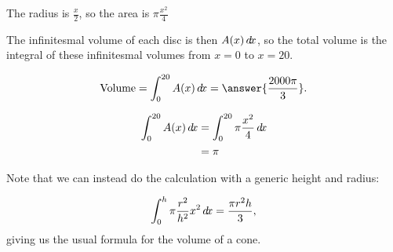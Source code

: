 \documentclass{ximera}
\begin{document}
\begin{example}
\begin{question}
\begin{hint}
	The radius is $\frac{x}{2}$, so the area is $\pi \frac{x^2}{4}$
\end{hint}
\end{question}

The infinitesmal volume of each disc is then $A(x) \mathop{}\!d\! x$, so the total volume is the integral of these infinitesmal volumes from $x = 0$ to $x = 20$.

\begin{question}
\[
\textrm{Volume} = 
  \int_0^{20} A(x) \d x=\answer{\frac{2000\pi}{3}}.
\]

\begin{hint}
	\begin{align*}
		\int_0^{20} A(x) \mathop{}\!d\! x &= \int_0^{20} \pi \frac{x^2}{4} \mathop{}\!d\! x\\ 
			&= \pi
	\end{align*}
\end{hint}
\end{question}

Note that we can instead do the calculation with a generic height and
radius: 

\[
  \int_0^{h} \pi\frac{r^2}{h^2}x^2\mathop{}\!d\! x
  = \frac{\pi r^2 h}{3},
\]
giving us the usual formula for the volume of a cone.
\end{example}
\end{document}
